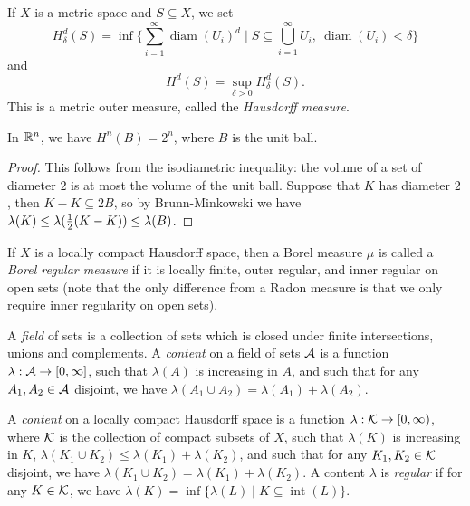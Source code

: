 \documentclass[letterpaper,11pt]{report}
\DeclareMathOperator{\diam}{diam}
\DeclareMathOperator{\inter}{int}
\begin{document}
\begin{defn} If $X$ is a metric space and $S \subseteq X$, we set
\[
H^d_\delta(S) = \inf\Big\{\sum_{i=1}^\infty \diam(U_i)^d \mid S \subseteq \bigcup_{i=1}^\infty U_i,\ \diam(U_i) < \delta\Big\}
\]
and
\[
H^d(S) = \sup_{\delta > 0} H^d_\delta(S).
\]
This is a metric outer measure, called the \emph{Hausdorff measure}.
\end{defn}

\begin{thm} In $\mathbb{R}^n$, we have $H^n(B) = 2^n$, where $B$ is the unit ball.
\end{thm}
\begin{proof} This follows from the isodiametric inequality: the volume of a set of diameter $2$ is at most the volume of the unit ball. Suppose that $K$ has diameter $2$, then $K-K \subseteq 2B$, so by Brunn-Minkowski we have $\lambda(K) \le \lambda(\frac{1}{2}(K-K)) \le \lambda(B)$.
\end{proof}

\begin{defn} If $X$ is a locally compact Hausdorff space, then a Borel measure $\mu$ is called a \emph{Borel regular measure} if it is locally finite, outer regular, and inner regular on open sets (note that the only difference from a Radon measure is that we only require inner regularity on open sets).
\end{defn}

\begin{defn} A \emph{field} of sets is a collection of sets which is closed under finite intersections, unions and complements. A \emph{content} on a field of sets $\mathcal{A}$ is a function $\lambda : \mathcal{A} \rightarrow [0,\infty]$, such that $\lambda(A)$ is increasing in $A$, and such that for any $A_1, A_2 \in \mathcal{A}$ disjoint, we have $\lambda(A_1 \cup A_2) = \lambda(A_1) + \lambda(A_2)$.
\end{defn}

\begin{defn} A \emph{content} on a locally compact Hausdorff space is a function $\lambda : \mathcal{K} \rightarrow [0,\infty)$, where $\mathcal{K}$ is the collection of compact subsets of $X$, such that $\lambda(K)$ is increasing in $K$, $\lambda(K_1 \cup K_2) \le \lambda(K_1) + \lambda(K_2)$, and such that for any $K_1, K_2 \in \mathcal{K}$ disjoint, we have $\lambda(K_1 \cup K_2) = \lambda(K_1) + \lambda(K_2)$. A content $\lambda$ is \emph{regular} if for any $K \in \mathcal{K}$, we have $\lambda(K) = \inf \{\lambda(L) \mid K \subseteq \inter(L)\}$.
\end{defn}
\end{document}
